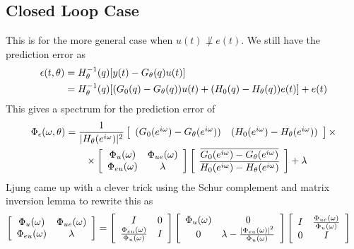 \subsection{Closed Loop Case}
This is for the more general case when $u(t)\not\perp e(t)$. We still have the prediction error as
\begin{align*}
\epsilon(t,\theta) &= H_\theta^{-1}(q)[y(t)-G_\theta(q) u(t)] \\
&= H_\theta^{-1}(q)[(G_0(q)-G_\theta(q))u(t)+(H_0(q)-H_\theta(q))e(t)]+e(t)
\end{align*}
This gives a spectrum for the prediction error of
\begin{align*}
\Phi_\epsilon(\omega,\theta) &= \frac{1}{|H_\theta(e^{i\omega})|^2}
\left[\begin{array}{c c} (G_0(e^{i\omega})-G_\theta(e^{i\omega})) & (H_0(e^{i\omega})-H_\theta(e^{i\omega})) \end{array}\right] \times \\
&\qquad\times \left[\begin{array}{c c} \Phi_u(\omega) & \Phi_{ue}(\omega) \\ \Phi_{eu}(\omega) & \lambda \end{array}\right]
\left[\begin{array}{c} \overline{G_0(e^{i\omega})-G_\theta(e^{i\omega})} \\ \overline{H_0(e^{i\omega})-H_\theta(e^{i\omega})} \end{array}\right] + \lambda
\end{align*}
Ljung came up with a clever trick using the Schur complement and matrix inversion lemma to rewrite this as
\begin{align*}
\left[\begin{array}{c c} \Phi_u(\omega) & \Phi_{ue}(\omega) \\ \Phi_{eu}(\omega) & \lambda \end{array}\right] &=
\left[\begin{array}{c c} I & 0 \\ \frac{\Phi_{eu}(\omega)}{\Phi_u(\omega)} & I \end{array}\right]
\left[\begin{array}{c c} \Phi_u(\omega) & 0 \\ 0 & \lambda-\frac{|\Phi_{eu}(\omega)|^2}{\Phi_u(\omega)} \end{array}\right]
\left[\begin{array}{c c} I & \frac{\Phi_{ue}(\omega)}{\Phi_u(\omega)} \\ 0 & I \end{array}\right]
\end{align*}

